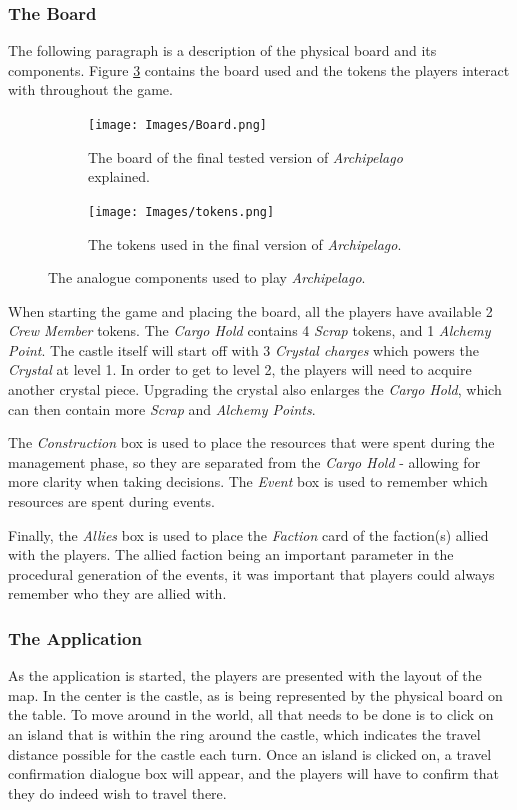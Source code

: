 \subsubsection{The Board}
The following paragraph is a description of the physical board and its components. Figure \ref{fig:compo} contains the board used and the tokens the players interact with throughout the game.
\begin{figure}[!ht]
   \centering
   \begin{subfigure}[b]{\textwidth}
       \texttt{[image: Images/Board.png]}
       \caption{The board of the final tested version of \textit{Archipelago} explained.}
       \label{fig:boardfinal}
   \end{subfigure}
   \begin{subfigure}[b]{\textwidth}
   \centering
       \texttt{[image: Images/tokens.png]}
       \caption{The tokens used in the final version of \textit{Archipelago}.}
       \label{fig:tokens}
   \end{subfigure}
   \caption{The analogue components used to play \textit{Archipelago}.}
   \label{fig:compo}
\end{figure}

When starting the game and placing the board, all the players have available 2 \textit{Crew Member} tokens. The \textit{Cargo Hold} contains 4 \textit{Scrap} tokens, and 1 \textit{Alchemy Point}. The castle itself will start off with 3 \textit{Crystal charges} which powers the \textit{Crystal} at level 1. In order to get to level 2, the players will need to acquire another crystal piece. Upgrading the crystal also enlarges the \textit{Cargo Hold}, which can then contain more \textit{Scrap} and \textit{Alchemy Points}.

The \textit{Construction} box is used to place the resources that were spent during the management phase, so they are separated from the \textit{Cargo Hold} - allowing for more clarity when taking decisions. The \textit{Event} box is used to remember which resources are spent during events. 

Finally, the \textit{Allies} box is used to place the \textit{Faction} card of the faction(s) allied with the players. The allied faction being an important parameter in the procedural generation of the events, it was important that players could always remember who they are allied with. 
\subsubsection{The Application}
As the application is started, the players are presented with the layout of the map. In the center is the castle, as is being represented by the physical board on the table. To move around in the world, all that needs to be done is to click on an island that is within the ring around the castle, which indicates the travel distance possible for the castle each turn. Once an island is clicked on, a travel confirmation dialogue box will appear, and the players will have to confirm that they do indeed wish to travel there.
